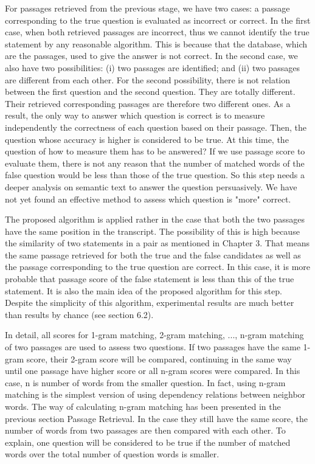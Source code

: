 For passages retrieved from the previous stage, we have two cases: a passage corresponding to the true question is evaluated as incorrect or correct. In the first case, when both retrieved passages are incorrect, thus we cannot identify the true statement by any reasonable algorithm. This is because that the database, which are the passages, used to give the answer is not correct. In the second case, we also have two possibilities: (i) two passages are identified; and (ii) two passages are different from each other. For the second possibility, there is not relation between the first question and the second question. They are totally different. Their retrieved corresponding passages are therefore two different ones. As a result, the only way to answer which question is correct is to measure independently the correctness of each question based on their passage. Then, the question whose accuracy is higher is considered to be true. At this time, the question of how to measure them has to be answered? If we use passage score to evaluate them, there is not any reason that the number of matched words of the false question would be less than those of the true question. So this step needs a deeper analysis on semantic text to answer the question persuasively. We have not yet found an effective method to assess which question is "more" correct.

The proposed algorithm is applied rather in the case that both the two passages have the same position in the transcript. The possibility of this is high because the similarity of two statements in a pair as mentioned in Chapter 3. That means the same passage retrieved for both the true and the false candidates as well as the passage corresponding to the true question are correct. In this case, it is more probable that passage score of the false statement is less than this of the true statement. It is also the main idea of the proposed algorithm for this step. Despite the simplicity of this algorithm, experimental results are much better than results by chance (see section 6.2).

In detail, all scores for 1-gram matching, 2-gram matching, ..., n-gram matching of two passages are used to assess two questions. If two passages have the same 1-gram score, their 2-gram score will be compared, continuing in the same way until one passage have higher score or all n-gram scores were compared. In this case, n is number of words from the smaller question. In fact, using n-gram matching is the simplest version of using dependency relations between neighbor words. The way of calculating n-gram matching has been presented in the previous section Passage Retrieval. In the case they still have the same score, the number of words from two passages are then compared with each other. To explain, one question will be considered to be true if the number of matched words over the total number of question words is smaller.

